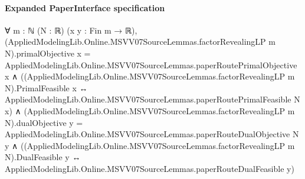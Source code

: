 \documentclass[10pt]{article}
\begin{document}
\paragraph{Expanded PaperInterface specification}
\begin{ReviewVerbatim}
∀ {m : ℕ} (N : ℝ) (x y : Fin m → ℝ),
  (AppliedModelingLib.Online.MSVV07SourceLemmas.factorRevealingLP m N).primalObjective x =
      AppliedModelingLib.Online.MSVV07SourceLemmas.paperRoutePrimalObjective x ∧
    ((AppliedModelingLib.Online.MSVV07SourceLemmas.factorRevealingLP m N).PrimalFeasible x ↔
        AppliedModelingLib.Online.MSVV07SourceLemmas.paperRoutePrimalFeasible N x) ∧
      (AppliedModelingLib.Online.MSVV07SourceLemmas.factorRevealingLP m N).dualObjective y =
          AppliedModelingLib.Online.MSVV07SourceLemmas.paperRouteDualObjective N y ∧
        ((AppliedModelingLib.Online.MSVV07SourceLemmas.factorRevealingLP m N).DualFeasible y ↔
          AppliedModelingLib.Online.MSVV07SourceLemmas.paperRouteDualFeasible y)
\end{ReviewVerbatim}
\end{document}
